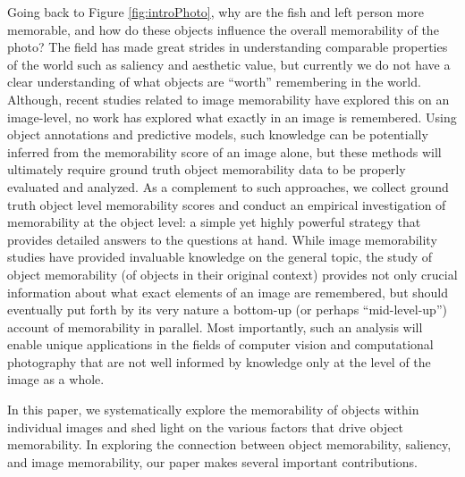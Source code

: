 Going back to Figure \ref{fig:introPhoto}, why are the fish and left person more memorable, and how do these objects influence the overall memorability of the photo? The field has made great strides in understanding comparable properties of the world such as saliency and aesthetic value, but currently we do not have a clear understanding of what objects are “worth” remembering in the world. Although, recent studies related to image memorability have explored this on an image-level, no work has explored what exactly in an image is remembered. Using object annotations and predictive models, such knowledge can be potentially inferred from the memorability score of an image alone, but these methods will ultimately require ground truth object memorability data to be properly evaluated and analyzed. As a complement to such approaches, we collect ground truth object level memorability scores and conduct an empirical investigation of  memorability at the object level: a simple yet highly powerful strategy that provides detailed answers to the questions at hand. While image memorability studies have provided invaluable knowledge on the general topic, the study of object memorability (of objects in their original context) provides not only crucial information about what exact elements of an image are remembered, but should eventually put forth by its very nature a bottom-up (or perhaps “mid-level-up”) account of memorability in parallel. Most importantly, such an analysis will enable unique applications in the fields of computer vision and computational photography that are not  well informed by knowledge only at the level of the image as a whole.



In this paper, we systematically explore the memorability of objects within individual images and shed light on the various factors that drive object memorability. In exploring the connection between object memorability, saliency, and image memorability, our paper makes several important contributions.

